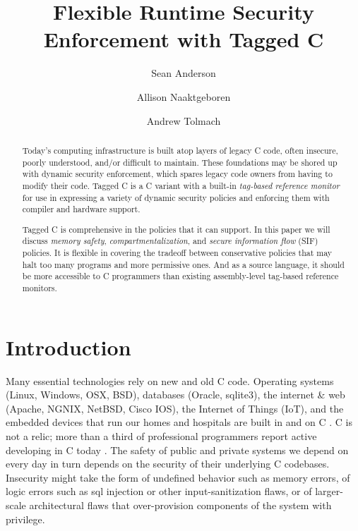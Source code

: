 \documentclass{llncs}
\title{Flexible Runtime Security Enforcement with Tagged C}
\author{Sean Anderson \and Allison Naaktgeboren \and Andrew Tolmach}
\institute{Portland State University}
\begin{document}





\maketitle

\begin{abstract}
Today's computing infrastructure is built atop layers of legacy C code, often
insecure, poorly understood, and/or difficult to maintain.
These foundations may be shored up with dynamic security enforcement,
which spares legacy code owners from having to modify their code.
Tagged C is a C variant with a built-in {\em tag-based reference monitor} for use in expressing
a variety of dynamic security policies and enforcing them with compiler and hardware support.

Tagged C is comprehensive in the policies that it can support. In this paper we will discuss
{\em memory safety}, {\em compartmentalization}, and {\em secure information flow} (SIF)
policies. It is flexible in covering the tradeoff between conservative policies that may
halt too many programs and more permissive ones. And as a source language, it should be
more accessible to C programmers than existing assembly-level tag-based reference monitors.

\end{abstract}

\section{Introduction}
Many essential technologies rely on new and old C code. 
Operating systems (Linux, Windows, OSX, BSD), databases (Oracle, sqlite3), the internet \&
web (Apache, NGNIX, NetBSD, Cisco IOS), the Internet of Things (IoT), and the 
embedded devices that run our homes and hospitals are built in and on C \cite{Munoz:PoweredbyC}. 
C is not a relic; more than a third of professional programmers report active developing
in C today \cite{stackoverflow22:dev-survey}. The safety of public and private systems we depend on every day
in turn depends on the security of their underlying C codebases. Insecurity might take the form
of undefined behavior such as memory errors, of logic errors such as sql injection or other
input-sanitization flaws, or of larger-scale architectural flaws that over-provision components of the
system with privilege.
\end{document}
